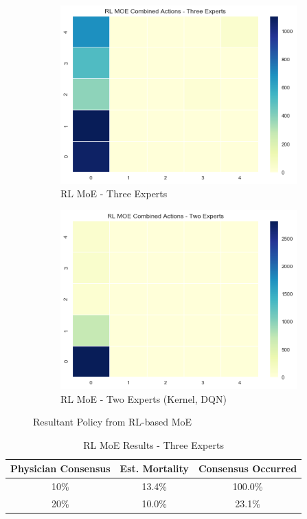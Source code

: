 \documentclass[letterpaper]{article}
\begin{document}
\begin{figure}[H]
  \centering
  \begin{subfigure}{0.45\linewidth}
  \centering
  \includegraphics[width=0.9\linewidth]{figures/RLMOE3.png}\hfill
  \caption{RL MoE - Three Experts}
  \label{fig:RLMOE3}
  \end{subfigure}
  \begin{subfigure}{0.45\linewidth}
  \includegraphics[width=0.9\linewidth]{figures/RLMOE2.png}\hfill
  \caption{RL MoE - Two Experts (Kernel, DQN)}
  \label{fig:RLMOE2}
  \end{subfigure}
  \caption{Resultant Policy from RL-based MoE}
  \label{fig:RLMOE}
\end{figure}

\begin{table}[H]
  \centering
  \caption{RL MoE Results - Three Experts}
  \begin{tabular}{|c|c|c|}
    \hline
     Physician Consensus & Est. Mortality & Consensus Occurred \\
     \hline
    10\%  & 13.4\% & 100.0\% \\
    \hline
    20\% & 10.0\% & 23.1\%\\
    \hline
  \end{tabular}
\end{table}
\end{document}

